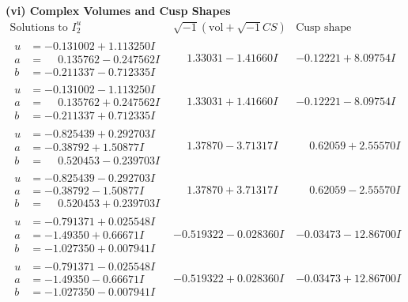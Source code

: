 \documentclass[1p]{elsarticle_modified}
\theoremstyle{definition}
\newcommand{\I}{\sqrt{-1}}
\begin{document}
\newpage\flushleft \textbf{(vi) Complex Volumes and Cusp Shapes}
$$\begin{array}{c|c|c}  
\text{Solutions to }I^u_{2}& \I (\text{vol} + \sqrt{-1}CS) & \text{Cusp shape}\\
 \hline 
\begin{aligned}
u &= -0.131002 + 1.113250 I \\
a &= \phantom{-}0.135762 - 0.247562 I \\
b &= -0.211337 - 0.712335 I\end{aligned}
 & \phantom{-}1.33031 - 1.41660 I & -0.12221 + 8.09754 I \\ \hline\begin{aligned}
u &= -0.131002 - 1.113250 I \\
a &= \phantom{-}0.135762 + 0.247562 I \\
b &= -0.211337 + 0.712335 I\end{aligned}
 & \phantom{-}1.33031 + 1.41660 I & -0.12221 - 8.09754 I \\ \hline\begin{aligned}
u &= -0.825439 + 0.292703 I \\
a &= -0.38792 + 1.50877 I \\
b &= \phantom{-}0.520453 - 0.239703 I\end{aligned}
 & \phantom{-}1.37870 - 3.71317 I & \phantom{-}0.62059 + 2.55570 I \\ \hline\begin{aligned}
u &= -0.825439 - 0.292703 I \\
a &= -0.38792 - 1.50877 I \\
b &= \phantom{-}0.520453 + 0.239703 I\end{aligned}
 & \phantom{-}1.37870 + 3.71317 I & \phantom{-}0.62059 - 2.55570 I \\ \hline\begin{aligned}
u &= -0.791371 + 0.025548 I \\
a &= -1.49350 + 0.66671 I \\
b &= -1.027350 + 0.007941 I\end{aligned}
 & -0.519322 - 0.028360 I & -0.03473 - 12.86700 I \\ \hline\begin{aligned}
u &= -0.791371 - 0.025548 I \\
a &= -1.49350 - 0.66671 I \\
b &= -1.027350 - 0.007941 I\end{aligned}
 & -0.519322 + 0.028360 I & -0.03473 + 12.86700 I \\ \hline\begin{aligned}

\end{aligned}
\end{array}$$
\end{document}
